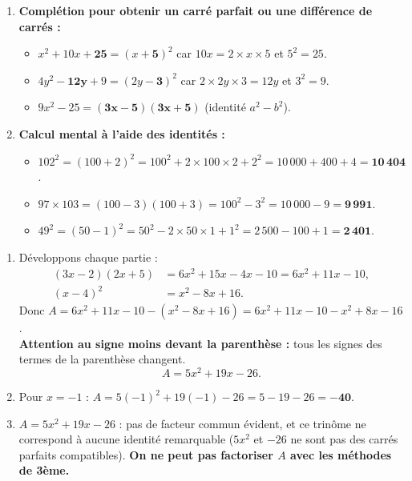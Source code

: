 \documentclass[11pt]{article}
\begin{document}
\begin{corrige}
\begin{enumerate}
    \item \textbf{Complétion pour obtenir un carré parfait ou une différence de carrés :}
    \begin{itemize}
        \item $x^2 + 10x + \mathbf{25} = (x + \mathbf{5})^2$ car $10x = 2\times x\times 5$ et $5^2 = 25$.
        \item $4y^2 - \mathbf{12y} + 9 = (2y - \mathbf{3})^2$ car $2\times 2y\times 3 = 12y$ et $3^2 = 9$.
        \item $9x^2 - 25 = (\mathbf{3x} - \mathbf{5})(\mathbf{3x} + \mathbf{5})$ (identité $a^2-b^2$).
    \end{itemize}
    \item \textbf{Calcul mental à l'aide des identités :}
    \begin{itemize}
        \item $102^2 = (100 + 2)^2 = 100^2 + 2\times 100\times 2 + 2^2 = 10\,000 + 400 + 4 = \mathbf{10\,404}$.
        \item $97 \times 103 = (100 - 3)(100 + 3) = 100^2 - 3^2 = 10\,000 - 9 = \mathbf{9\,991}$.
        \item $49^2 = (50 - 1)^2 = 50^2 - 2\times 50\times 1 + 1^2 = 2\,500 - 100 + 1 = \mathbf{2\,401}$.
    \end{itemize}
\end{enumerate}
\end{corrige}

\begin{corrige}
\begin{enumerate}
    \item Développons chaque partie :
    \begin{align*}
    (3x-2)(2x+5) &= 6x^2 + 15x - 4x - 10 = 6x^2 + 11x - 10,\\
    (x-4)^2 &= x^2 - 8x + 16.
    \end{align*}
    Donc $A = 6x^2 + 11x - 10 - (x^2 - 8x + 16) = 6x^2 + 11x - 10 - x^2 + 8x - 16$.\\
    \textbf{Attention au signe moins devant la parenthèse :} tous les signes des termes de la parenthèse changent.
    \[A = 5x^2 + 19x - 26.\]
    \item Pour $x = -1$ : $A = 5(-1)^2 + 19(-1) - 26 = 5 - 19 - 26 = \mathbf{-40}$.
    \item $A = 5x^2 + 19x - 26$ : pas de facteur commun évident, et ce trinôme ne correspond à aucune identité remarquable ($5x^2$ et $-26$ ne sont pas des carrés parfaits compatibles). \textbf{On ne peut pas factoriser $A$ avec les méthodes de 3ème.}
\end{enumerate}
\end{corrige}
\end{document}
